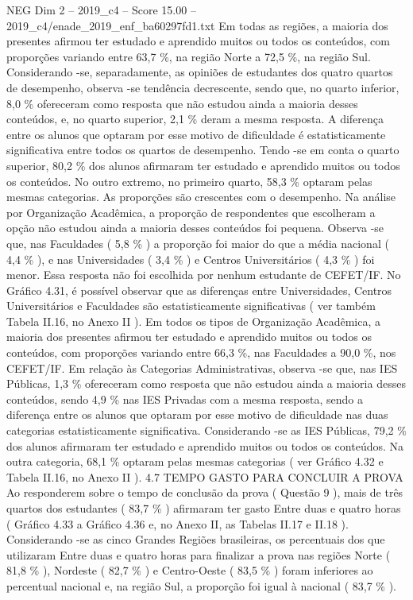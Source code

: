 \begin{textsample}{NEG Dim 2 – 2019\_c4 – Score 15.00 – 2019\_c4/enade\_2019\_enf\_ba60297fd1.txt}
Em todas as regiões, a maioria dos presentes afirmou ter estudado e aprendido muitos ou todos os conteúdos, com proporções variando entre 63,7 \%, na região Norte a 72,5 \%, na região Sul.
Considerando -se, separadamente, as opiniões de estudantes dos quatro quartos de desempenho, observa -se tendência decrescente, sendo que, no quarto inferior, 8,0 \% ofereceram como resposta que não estudou ainda a maioria desses conteúdos, e, no quarto superior, 2,1 \% deram a mesma resposta.
A diferença entre os alunos que optaram por esse motivo de dificuldade é estatisticamente significativa entre todos os quartos de desempenho.
Tendo -se em conta o quarto superior, 80,2 \% dos alunos afirmaram ter estudado e aprendido muitos ou todos os conteúdos.
No outro extremo, no primeiro quarto, 58,3 \% optaram pelas mesmas categorias.
As proporções são crescentes com o desempenho.
Na análise por Organização Acadêmica, a proporção de respondentes que escolheram a opção não estudou ainda a maioria desses conteúdos foi pequena.
Observa -se que, nas Faculdades ( 5,8 \% ) a proporção foi maior do que a média nacional ( 4,4 \% ), e nas Universidades ( 3,4 \% ) e Centros Universitários ( 4,3 \% ) foi menor.
Essa resposta não foi escolhida por nenhum estudante de CEFET/IF.
No Gráfico 4.31, é possível observar que as diferenças entre Universidades, Centros Universitários e Faculdades são estatisticamente significativas ( ver também Tabela II.16, no Anexo II ).
Em todos os tipos de Organização Acadêmica, a maioria dos presentes afirmou ter estudado e aprendido muitos ou todos os conteúdos, com proporções variando entre 66,3 \%, nas Faculdades a 90,0 \%, nos CEFET/IF.
Em relação às Categorias Administrativas, observa -se que, nas IES Públicas, 1,3 \% ofereceram como resposta que não estudou ainda a maioria desses conteúdos, sendo 4,9 \% nas IES Privadas com a mesma resposta, sendo a diferença entre os alunos que optaram por esse motivo de dificuldade nas duas categorias estatisticamente significativa.
Considerando -se as IES Públicas, 79,2 \% dos alunos afirmaram ter estudado e aprendido muitos ou todos os conteúdos.
Na outra categoria, 68,1 \% optaram pelas mesmas categorias ( ver Gráfico 4.32 e Tabela II.16, no Anexo II ). 4.7 TEMPO GASTO PARA CONCLUIR A PROVA Ao responderem sobre o tempo de conclusão da prova ( Questão 9 ), mais de três quartos dos estudantes ( 83,7 \% ) afirmaram ter gasto Entre duas e quatro horas ( Gráfico 4.33 a Gráfico 4.36 e, no Anexo II, as Tabelas II.17 e II.18 ).
Considerando -se as cinco Grandes Regiões brasileiras, os percentuais dos que utilizaram Entre duas e quatro horas para finalizar a prova nas regiões Norte ( 81,8 \% ), Nordeste ( 82,7 \% ) e Centro-Oeste ( 83,5 \% ) foram inferiores ao percentual nacional e, na região Sul, a proporção foi igual à nacional ( 83,7 \% ).

\end{textsample}
